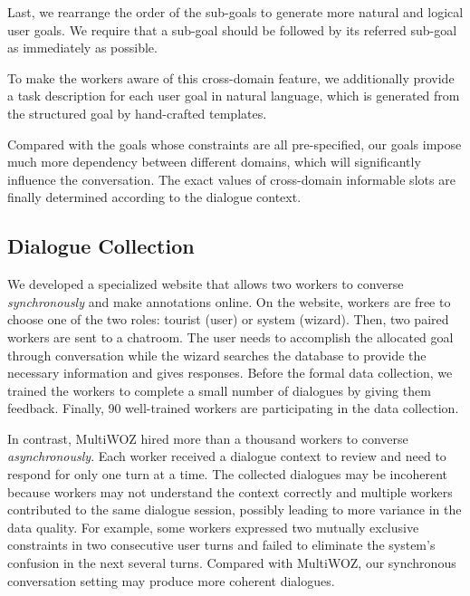 Last, we rearrange the order of the sub-goals to generate more natural and logical user goals. We require that a sub-goal should be followed by its referred sub-goal as immediately as possible.

To make the workers aware of this cross-domain feature, we additionally provide a task description for each user goal in natural language, which is generated from the structured goal by hand-crafted templates.

Compared with the goals whose constraints are all pre-specified, our goals impose much more dependency between different domains, which will significantly influence the conversation. The exact values of cross-domain informable slots are finally determined according to the dialogue context.

\subsection{Dialogue Collection}
We developed a specialized website that allows two workers to converse \emph{synchronously} and make annotations online. On the website, workers are free to choose one of the two roles: tourist (user) or system (wizard). Then, two paired workers are sent to a chatroom. The user needs to accomplish the allocated goal through conversation while the wizard searches the database to provide the necessary information and gives responses. Before the formal data collection, we trained the workers to complete a small number of dialogues by giving them feedback. Finally, 90 well-trained workers are participating in the data collection.

In contrast, MultiWOZ \cite{Multiwoz2018} hired more than a thousand workers to converse \emph{asynchronously}. Each worker received a dialogue context to review and need to respond for only one turn at a time. The collected dialogues may be incoherent because workers may not understand the context correctly and multiple workers contributed to the same dialogue session, possibly leading to more variance in the data quality. For example, some workers expressed two mutually exclusive constraints in two consecutive user turns and failed to eliminate the system's confusion in the next several turns.
Compared with MultiWOZ, our synchronous conversation setting may produce more coherent dialogues.

